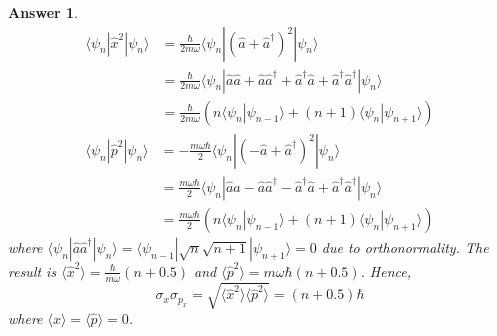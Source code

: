 \documentclass[a4paper]{article}
\newtheorem{ans}{Answer}[section]
\theoremstyle{new}
\begin{document}
\begin{ans}
\begin{align}
\langle\psi_n|\hat{x}^2|\psi_n\rangle&=\frac{\hbar}{2m\omega}\langle\psi_n|(\hat{a}+\hat{a}^\dag)^2|\psi_n\rangle\nonumber\\&=\frac{\hbar}{2m\omega}\langle\psi_n|\hat{a}\hat{a}+\hat{a}\hat{a}^\dag+\hat{a}^\dag\hat{a}+\hat{a}^\dag\hat{a}^\dag|\psi_n\rangle\nonumber\\&=\frac{\hbar}{2m\omega}(n\langle\psi_n|\psi_{n-1}\rangle+(n+1)\langle\psi_n|\psi_{n+1}\rangle)\nonumber
\end{align}
\begin{align}
\langle\psi_n|\hat{p}^2|\psi_n\rangle&=-\frac{m\omega\hbar}{2}\langle\psi_n|(-\hat{a}+\hat{a}^\dag)^2|\psi_n\rangle\nonumber\\&=\frac{m\omega\hbar}{2}\langle\psi_n|\hat{a}\hat{a}-\hat{a}\hat{a}^\dag-\hat{a}^\dag\hat{a}+\hat{a}^\dag\hat{a}^\dag|\psi_n\rangle\nonumber\\&=\frac{m\omega\hbar}{2}(n\langle\psi_n|\psi_{n-1}\rangle+(n+1)\langle\psi_n|\psi_{n+1}\rangle)\nonumber
\end{align}
where $\langle\psi_n|\hat{a}\hat{a}^\dag|\psi_n\rangle=\langle\psi_{n-1}|\sqrt{n}\sqrt{n+1}|\psi_{n+1}\rangle=0$ due to orthonormality. The result is $\langle \hat{x}^2\rangle=\frac{\hbar}{m\omega}(n+0.5)$ and $\langle\hat{p}^2\rangle=m\omega\hbar(n+0.5)$. Hence, 
$$\sigma_x\sigma_{p_x}=\sqrt{\langle\hat{x}^2\rangle\langle\hat{p}^2\rangle}=(n+0.5)\hbar$$
where $\langle\hat{x}\rangle=\langle\hat{p}\rangle=0$.
\end{ans}
\end{document}
